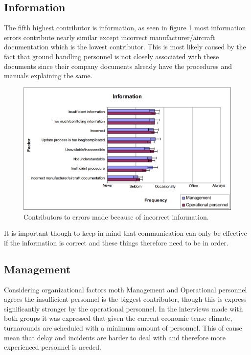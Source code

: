 \subsection{Information} %
The fifth highest contributor is information, as seen in figure \ref{Information} most information errors contribute nearly similar except  incorrect manufacturer/aircraft documentation which is the lowest contributor. This is most likely caused by the fact that ground handling personnel is not closely associated with these documents since their company documents already have the procedures and manuals explaining the same.

\begin{figure}[H]
\centering
\includegraphics[width=\textwidth]{Grafik/Information}
\caption{Contributors to errors made because of incorrect information.}
\label{Information}
\end{figure}

It is important though to keep in mind that communication can only be effective if the information is correct and these things therefore need to be in order.

\subsection{Management} %
Considering organizational factors moth Management and Operational personnel agrees the insufficient personnel is the biggest contributor, though this is express significantly stronger by the operational personnel. In the interviews made with both groups it was expressed that given the current economic tense climate, turnarounds are scheduled with a minimum amount of personnel. This of cause mean that delay and incidents are harder to deal with and therefore more experienced personnel is needed.

